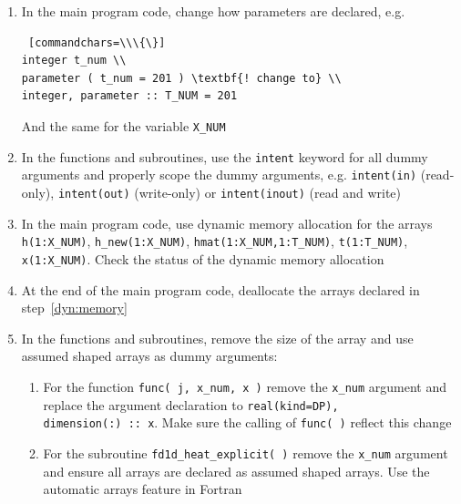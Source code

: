 \documentclass[12pt]{article}
\begin{document}
\begin{enumerate}
- remember to close the file \texttt{fd1d\_heat\_explicit.f90} in any editor:
\begin{Verbatim} [commandchars=\\\{\}]
nagfor \textbf{=polish -relational=F90+ -kwcase=L -margin=0 -indent=2} \textbackslash \\
  \textbf{-dcolon_in_decls=Insert -character_decl=Keywords} \textbackslash \\
  fd1d_heat_explicit.f90 -o \textit{fd1d_heat_explicit.f90_pol}
mv \textit{fd1d_heat_explicit.f90_pol} fd1d_heat_explicit.f90
\end{Verbatim}
\item In the main program code, change how parameters are declared, e.g.
\begin{Verbatim} [commandchars=\\\{\}]
integer t_num \\
parameter ( t_num = 201 ) \textbf{! change to} \\
integer, parameter :: T_NUM = 201
\end{Verbatim}
And the same for the variable \texttt{X\_NUM}
\item In the functions and subroutines, use the \texttt{intent} keyword for all dummy arguments and properly
  scope the dummy arguments, e.g. \texttt{intent(in)} (read-only), \texttt{intent(out)} (write-only) or
  \texttt{intent(inout)} (read and write)
\item In the main program code, use dynamic memory allocation for the arrays \texttt{h(1:X\_NUM)}, 
\texttt{h\_new(1:X\_NUM)}, \texttt{hmat(1:X\_NUM,1:T\_NUM)}, \texttt{t(1:T\_NUM)}, \texttt{x(1:X\_NUM)}. Check
the status of the dynamic memory allocation\label{dyn:memory}
\item At the end of the main program code, deallocate the arrays declared in step~\ref{dyn:memory}
\item In the functions and subroutines, remove the size of the array and use assumed shaped
arrays as dummy arguments:
\begin{enumerate}
\item For the function \texttt{func( j, x\_num, x )} remove the \texttt{x\_num} argument and
replace the argument declaration to \texttt{real(kind=DP), dimension(:)\ ::\ x}. Make sure
the calling of \texttt{func( )} reflect this change
\item For the subroutine \texttt{fd1d\_heat\_explicit( )} remove the \texttt{x\_num} argument
and ensure all arrays are declared as assumed shaped arrays. Use the automatic arrays feature in Fortran

\end{enumerate}
\end{enumerate}
\end{document}
